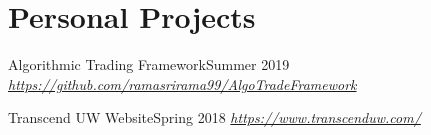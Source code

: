 \section{Personal Projects}
  \CVSubHeadingListStart
    \CVSubheading
      {Algorithmic Trading Framework}{Summer 2019}
      {{\emph{\small{\href{https://github.com/ramasrirama99/AlgoTradeFramework}{https://github.com/ramasrirama99/AlgoTradeFramework}}}}}{}
      

    \CVSubheading
      {Transcend UW Website}{Spring 2018}
      {{\emph{\small{\href{https://www.transcenduw.com/}{https://www.transcenduw.com/}}}}}{}

  \CVSubHeadingListEnd